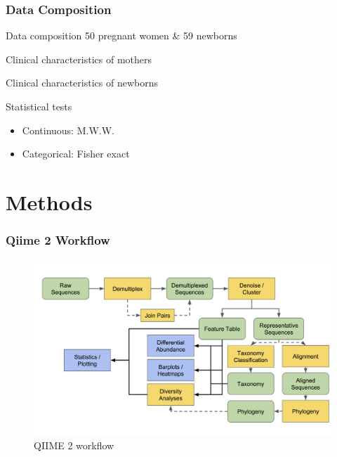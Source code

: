 \documentclass{beamer}
\begin{document}
    \begin{frame}[allowframebreaks]
        \frametitle{Data Composition}

        \begin{block}{Data composition}
            50 pregnant women \& 59 newborns
        \end{block}

        \begin{table}
            \centering
            \caption{Clinical characteristics of mothers}
            \resizebox{!}{\ifdimcomp{\height}{<}{0.25 \textheight}{\height}{0.25 \textheight}}
            {}
        \end{table}

        \begin{table}
            \centering
            \caption{Clinical characteristics of newborns}
            \resizebox{!}{\ifdimcomp{\height}{<}{0.25 \textheight}{\height}{0.25 \textheight}}
            {}
        \end{table}

        \begin{exampleblock}{Statistical tests}
            \begin{itemize}
                \item Continuous: M.W.W.
                \item Categorical: Fisher exact
            \end{itemize}
        \end{exampleblock}
    \end{frame}

    \section{Methods}
    \begin{frame}
        \frametitle{Qiime 2 Workflow}

        \begin{figure}
            \includegraphics[width=0.8 \linewidth]{figures/qiime.png}
            \caption{QIIME 2 workflow \protect\cite{qiime1, qiime2, qiime3}}
        \end{figure}
    \end{frame}
\end{document}
